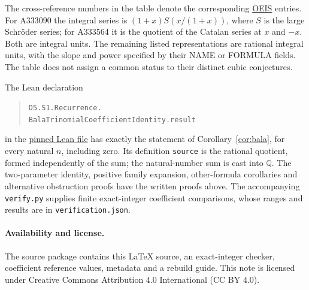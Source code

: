 \documentclass[11pt]{article}
\begin{document}
\normalsize
The cross-reference numbers in the table denote the corresponding
\href{https://oeis.org}{OEIS} entries. For A333090 the integral series is
$(1+x)S(x/(1+x))$, where $S$ is the large Schr\"oder series; for A333564
it is the quotient of the Catalan series at $x$ and $-x$. Both are integral
units. The remaining listed representations are rational integral units,
with the slope and power specified by their NAME or FORMULA fields.
The table does not assign a common status to their distinct cubic conjectures.

The Lean declaration
\begin{quote}\small
\texttt{D5.S1.Recurrence.}\\
\texttt{BalaTrinomialCoefficientIdentity.result}
\end{quote}
in the \href{https://github.com/the-omega-institute/trureturing/blob/4a7117cee792c7d5598d7f4770577d557fb45137/D5/S1/Recurrence/BalaTrinomialCoefficientIdentity.lean}{pinned Lean file}
has exactly the statement of Corollary~\ref{cor:bala}, for every natural
$n$, including zero. Its definition \texttt{source} is the rational quotient,
formed independently of the sum; the natural-number sum is cast into
$\mathbb Q$. The two-parameter identity, positive family expansion,
other-formula corollaries and alternative obstruction proofs have the written
proofs above. The accompanying \texttt{verify.py} supplies finite exact-integer
coefficient comparisons, whose ranges and results are in \texttt{verification.json}.

\paragraph{Availability and license.}
The source package contains this \LaTeX{} source, an exact-integer checker,
coefficient reference values, metadata and a rebuild guide.
This note is licensed under Creative Commons Attribution 4.0 International
(CC BY 4.0).
\end{document}
